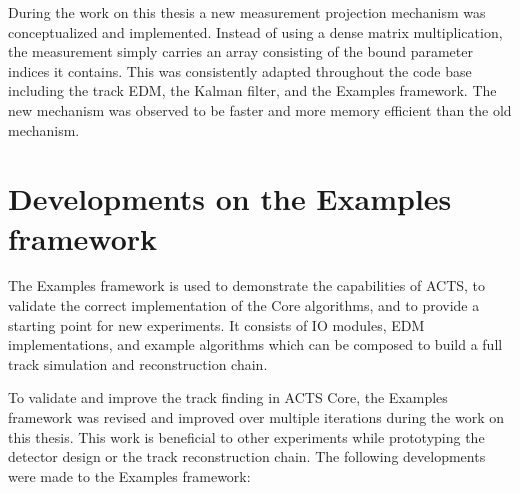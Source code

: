 During the work on this thesis a new measurement projection mechanism was conceptualized and implemented. Instead of using a dense matrix multiplication, the measurement simply carries an array consisting of the bound parameter indices it contains. This was consistently adapted throughout the code base including the track EDM, the Kalman filter, and the Examples framework. The new mechanism was observed to be faster and more memory efficient than the old mechanism.

\section{Developments on the Examples framework}

The Examples framework is used to demonstrate the capabilities of ACTS, to validate the correct implementation of the Core algorithms, and to provide a starting point for new experiments. It consists of IO modules, EDM implementations, and example algorithms which can be composed to build a full track simulation and reconstruction chain.

To validate and improve the track finding in ACTS Core, the Examples framework was revised and improved over multiple iterations during the work on this thesis. This work is beneficial to other experiments while prototyping the detector design or the track reconstruction chain. The following developments were made to the Examples framework:

